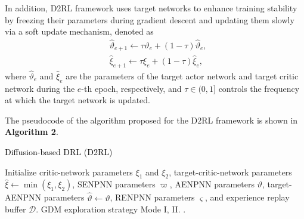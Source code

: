 \documentclass[comsoc,journal]{IEEEtran}
\begin{document}
In addition, D2RL framework uses target networks to enhance training stability by freezing their parameters during gradient descent and updating them slowly via a soft update mechanism, denoted as
\begin{equation}\label{eq:update A, Q}
    \begin{aligned}
        &\hat{\vartheta}_{e+1} \leftarrow \tau \vartheta_e + (1 - \tau)\hat{\vartheta}_e,\\
        &\hat{\xi}_{e+1} \leftarrow \tau \xi_e + (1 - \tau) \hat{\xi}_e,
    \end{aligned}
\end{equation}
where $\hat{\vartheta}_e$ and $\hat{\xi}_e$ are the parameters of the target actor network and target critic network during the $e$-th epoch, respectively, and $\tau \in (0, 1]$ controls the frequency at which the target network is updated\cite{hu2023intelligent}.

The pseudocode of the algorithm proposed for the D2RL framework is shown in \textbf{Algorithm 2}.
\begin{algorithm}[!t]
\label{algo2:D2RL}
 \caption{\textcolor{black}{Diffusion-based DRL (D2RL)}}
\begin{algorithmic}
 Initialize critic-network parameters $\xi_1$ and $\xi_2$, target-critic-network parameters $\hat{\xi} \leftarrow \min(\xi_1,\xi_2)$, SENPNN parameters $\varpi$, AENPNN parameters $\vartheta$, target-AENPNN parameters $\hat{\vartheta} \leftarrow \vartheta$, RENPNN parameters $\varsigma$, and experience replay buffer $\mathcal{D}$.
 GDM exploration strategy Mode I, II.
.
\ENDFOR
{}
\ENDFOR
{}
\end{algorithmic}
\end{algorithm}
\vspace{-6pt}
\end{document}
